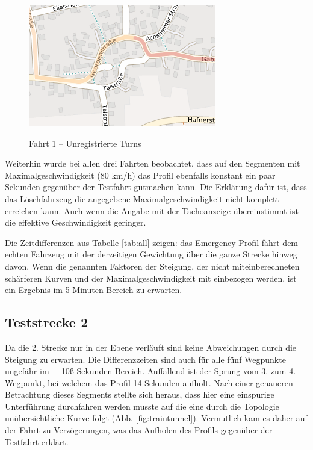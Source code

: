 \begin{figure}[h]
\centering
\caption{Fahrt 1 -- Unregistrierte Turns}
\label{fig:curve}
\includegraphics[width = 0.50 \textwidth]{../media/Fahrt1_curve.png} \\
\end{figure}


Weiterhin wurde bei allen drei Fahrten beobachtet, dass auf den Segmenten mit Maximalgeschwindigkeit (80 km/h) das Profil ebenfalls konstant ein paar Sekunden gegenüber der Testfahrt gutmachen kann.
Die Erklärung dafür ist, dass das Löschfahrzeug die angegebene Maximalgeschwindigkeit nicht komplett erreichen kann.
Auch wenn die Angabe mit der Tachoanzeige übereinstimmt ist die effektive Geschwindigkeit geringer.

Die Zeitdifferenzen aus Tabelle \ref{tab:all} zeigen: das Emergency-Profil fährt dem echten Fahrzeug mit der derzeitigen Gewichtung über die ganze Strecke hinweg davon.
Wenn die genannten Faktoren der Steigung, der nicht miteinberechneten schärferen Kurven und der Maximalgeschwindigkeit mit einbezogen werden, ist ein Ergebnis im 5 Minuten Bereich zu erwarten.


\subsection{Teststrecke 2}

Da die 2. Strecke nur in der Ebene verläuft sind keine Abweichungen durch die Steigung zu erwarten.
Die Differenzzeiten sind auch für alle fünf Wegpunkte ungefähr im +-10ß-Sekunden-Bereich.
Auffallend ist der Sprung vom 3. zum 4. Wegpunkt, bei welchem das Profil 14 Sekunden aufholt.
Nach einer genaueren Betrachtung dieses Segments stellte sich heraus, dass hier eine einspurige Unterführung durchfahren werden musste auf die eine durch die Topologie unübersichtliche Kurve folgt (Abb. \ref{fig:traintunnel}).
Vermutlich kam es daher auf der Fahrt zu Verzögerungen, was das Aufholen des Profils gegenüber der Testfahrt erklärt.

